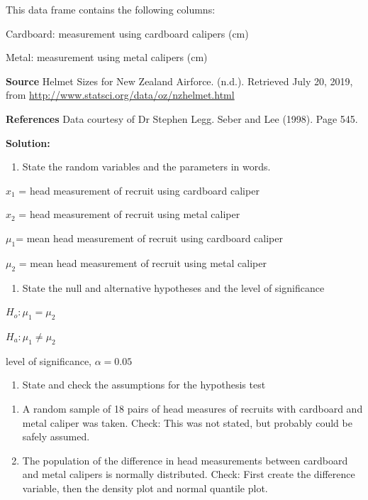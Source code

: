 \documentclass[
]{book}
\providecommand{\tightlist}{%
  \setlength{\itemsep}{0pt}\setlength{\parskip}{0pt}}
\begin{document}
This data frame contains the following columns:

Cardboard: measurement using cardboard calipers (cm)

Metal: measurement using metal calipers (cm)

\textbf{Source}
Helmet Sizes for New Zealand Airforce. (n.d.). Retrieved July 20, 2019, from \url{http://www.statsci.org/data/oz/nzhelmet.html}

\textbf{References}
Data courtesy of Dr Stephen Legg. Seber and Lee (1998). Page 545.

\textbf{Solution:}

\begin{enumerate}
\def\labelenumi{\arabic{enumi}.}
\tightlist
\item
  State the random variables and the parameters in words.
\end{enumerate}

\(x_1\) = head measurement of recruit using cardboard caliper

\(x_2\) = head measurement of recruit using metal caliper

\(\mu_1\)= mean head measurement of recruit using cardboard caliper

\(\mu_2\) = mean head measurement of recruit using metal caliper

\begin{enumerate}
\def\labelenumi{\arabic{enumi}.}
\setcounter{enumi}{1}
\tightlist
\item
  State the null and alternative hypotheses and the level of significance
\end{enumerate}

\(H_o:\mu_1=\mu_2\)

\(H_a:\mu_1\ne \mu_2\)

level of significance, \(\alpha=0.05\)

\begin{enumerate}
\def\labelenumi{\arabic{enumi}.}
\setcounter{enumi}{2}
\tightlist
\item
  State and check the assumptions for the hypothesis test
\end{enumerate}

\begin{enumerate}
\def\labelenumi{\alph{enumi}.}
\item
  A random sample of 18 pairs of head measures of recruits with cardboard and metal caliper was taken. Check: This was not stated, but probably could be safely assumed.
\item
  The population of the difference in head measurements between cardboard and metal calipers is normally distributed. Check: First create the difference variable, then the density plot and normal quantile plot.
\end{enumerate}
\end{document}
